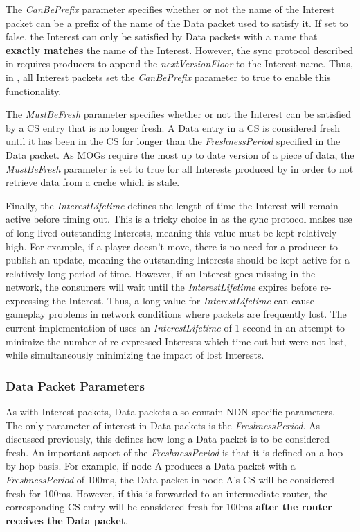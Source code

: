 The \textit{CanBePrefix} parameter specifies whether or not the name of the Interest packet can be a prefix of the name of the Data packet used to satisfy it. If set to false, the Interest can only be satisfied by Data packets with a name that \textbf{exactly matches} the name of the Interest. However, the sync protocol described in  requires producers to append the \textit{nextVersionFloor} to the Interest name. Thus, in \game{}, all Interest packets set the \textit{CanBePrefix} parameter to true to enable this functionality.

The \textit{MustBeFresh} parameter specifies whether or not the Interest can be satisfied by a CS entry that is no longer fresh. A Data entry in a CS is considered fresh until it has been in the CS for longer than the \textit{FreshnessPeriod} specified in the Data packet. As MOGs require the most up to date version of a piece of data, the \textit{MustBeFresh} parameter is set to true for all Interests produced by \game{} in order to not retrieve data from a cache which is stale.

Finally, the \textit{InterestLifetime} defines the length of time the Interest will remain active before timing out. This is a tricky choice in \game{} as the sync protocol makes use of long-lived outstanding Interests, meaning this value must be kept relatively high. For example, if a player doesn't move, there is no need for a producer to publish an update, meaning the outstanding Interests should be kept active for a relatively long period of time. However, if an Interest goes missing in the network, the consumers will wait until the \textit {InterestLifetime} expires before re-expressing the Interest. Thus, a long value for \textit{InterestLifetime} can cause gameplay problems in network conditions where packets are frequently lost. The current implementation of \game{} uses an \textit{InterestLifetime} of 1 second in an attempt to minimize the number of re-expressed Interests which time out but were not lost, while simultaneously minimizing the impact of lost Interests.

\subsubsection{Data Packet Parameters}
As with Interest packets, Data packets also contain NDN specific parameters. The only parameter of interest in Data packets is the \textit{FreshnessPeriod}. As discussed previously, this defines how long a Data packet is to be considered fresh. An important aspect of the \textit{FreshnessPeriod} is that it is defined on a hop-by-hop basis. For example, if node A produces a Data packet with a \textit{FreshnessPeriod} of 100ms, the Data packet in node A's CS will be considered fresh for 100ms. However, if this is forwarded to an intermediate router, the corresponding CS entry will be considered fresh for 100ms \textbf{after the router receives the Data packet}. 

